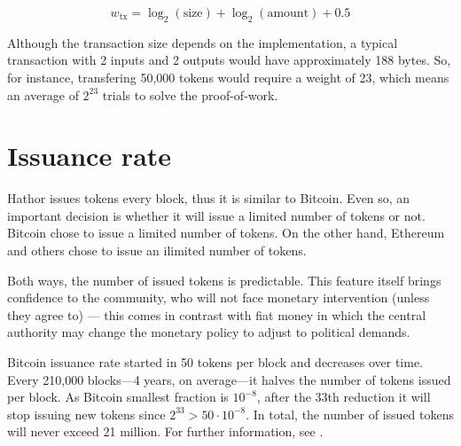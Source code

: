 $$w_\text{tx} = \log_2(\text{size}) + \log_2(\text{amount}) + 0.5$$

Although the transaction size depends on the implementation, a typical transaction with 2 inputs and 2 outputs would have approximately 188 bytes. So, for instance, transfering 50,000 tokens would require a weight of 23, which means an average of $2^{23}$ trials to solve the proof-of-work.


\section{Issuance rate}

Hathor issues tokens every block, thus it is similar to Bitcoin. Even so, an important decision is whether it will issue a limited number of tokens or not. Bitcoin chose to issue a limited number of tokens. On the other hand, Ethereum and others chose to issue an ilimited number of tokens.

Both ways, the number of issued tokens is predictable. This feature itself brings confidence to the community, who will not face monetary intervention (unless they agree to) --- this comes in contrast with fiat money in which the central authority may change the monetary policy to adjust to political demands.

Bitcoin issuance rate started in 50 tokens per block and decreases over time. Every 210,000 blocks---4 years, on average---it halves the number of tokens issued per block. As Bitcoin smallest fraction is $10^{-8}$, after the 33th reduction it will stop issuing new tokens since $2^{33} > 50 \cdot 10^{-8}$. In total, the number of issued tokens will never exceed 21 million. For further information, see \cite{bitcoinsupply}.





